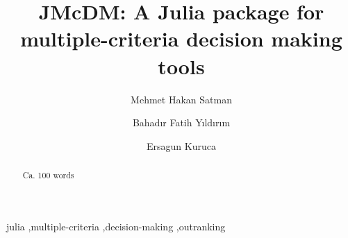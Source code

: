 \documentclass[preprint,review, 12pt, a4paper]{elsarticle}
\begin{document}
\begin{frontmatter}



\title{JMcDM: A Julia package for multiple-criteria decision making tools}


\author[author1]{Mehmet Hakan Satman}
\author[author2]{Bahadır Fatih Yıldırım}
\author[author3]{Ersagun Kuruca}


\address[author1]{Istanbul University, Department of Econometrics, Beyazit, Istanbul, Turkey}
\address[author2]{Istanbul University, Department of Transportation and Logistics, Avcilar, Istanbul, Turkey}
\address[author3]{Istanbul Technical University, Department of Computer Engineering, Sariyer,  Istanbul, Turkey}





\begin{abstract}
Ca. 100 words

\end{abstract}

\begin{keyword}
julia  \sep multiple-criteria \sep decision-making \sep outranking



\end{keyword}

\end{frontmatter}
\end{document}
